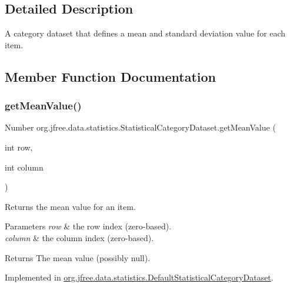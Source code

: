 \subsection{Detailed Description}
A category dataset that defines a mean and standard deviation value for each item. 

\subsection{Member Function Documentation}
\mbox{\label{interfaceorg_1_1jfree_1_1data_1_1statistics_1_1_statistical_category_dataset_ad09fbb6d9b82afd58a0be6a55d62bee8}} 
\subsubsection{\texorpdfstring{get\+Mean\+Value()}{getMeanValue()}\hspace{0.1cm}{\footnotesize\ttfamily [1/2]}}
{\footnotesize\ttfamily Number org.\+jfree.\+data.\+statistics.\+Statistical\+Category\+Dataset.\+get\+Mean\+Value (\begin{DoxyParamCaption}\item[{int}]{row,  }\item[{int}]{column }\end{DoxyParamCaption})}

Returns the mean value for an item.


\begin{DoxyParams}{Parameters}
{\em row} & the row index (zero-\/based). \\
\hline
{\em column} & the column index (zero-\/based).\\
\hline
\end{DoxyParams}
\begin{DoxyReturn}{Returns}
The mean value (possibly {\ttfamily null}). 
\end{DoxyReturn}


Implemented in \mbox{\hyperlink{classorg_1_1jfree_1_1data_1_1statistics_1_1_default_statistical_category_dataset_ae496e2b111f9a639e035e06643777232}{org.\+jfree.\+data.\+statistics.\+Default\+Statistical\+Category\+Dataset}}.

